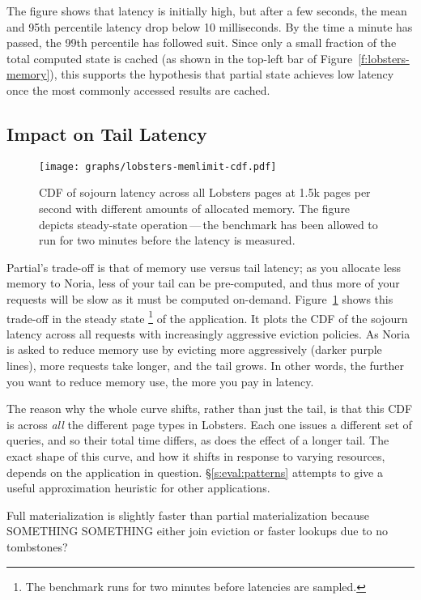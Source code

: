 The figure shows that latency is initially high, but after a few seconds, the
mean and 95th percentile latency drop below 10 milliseconds. By the time a
minute has passed, the 99th percentile has followed suit. Since only a small
fraction of the total computed state is cached (as shown in the top-left bar of
Figure~\ref{f:lobsters-memory}), this supports the hypothesis that partial state 
achieves low latency once the most commonly accessed results are cached.

\subsection{Impact on Tail Latency}

\begin{figure}[h]
  \centering
  \texttt{[image: graphs/lobsters-memlimit-cdf.pdf]}
  \caption{CDF of sojourn latency across all Lobsters pages at 1.5k pages per
  second with different amounts of allocated memory. The figure depicts
  steady-state operation\,---\,the benchmark has been allowed to run for two
  minutes before the latency is measured.}
  \label{f:lobsters-mem-latency}
\end{figure}

Partial's trade-off is that of memory use versus tail latency; as you allocate
less memory to Noria, less of your tail can be pre-computed, and thus more of
your requests will be slow as it must be computed on-demand.
Figure~\ref{f:lobsters-mem-latency} shows this trade-off in the steady state%
\footnote{The benchmark runs for two minutes before latencies are sampled.}
of the application. It plots the CDF of the sojourn latency across all requests
with increasingly aggressive eviction policies. As Noria is asked to
reduce memory use by evicting more aggressively (darker purple lines), more
requests take longer, and the tail grows. In other words, the further you want
to reduce memory use, the more you pay in latency.

The reason why the whole curve shifts, rather than just the tail, is that this
CDF is across \emph{all} the different page types in Lobsters. Each one issues a
different set of queries, and so their total time differs, as does the effect of
a longer tail. The exact shape of this curve, and how it shifts in response to
varying resources, depends on the application in question.
\S\ref{s:eval:patterns} attempts to give a useful approximation heuristic for
other applications.

\begin{inprogress}
Full materialization is slightly faster than partial materialization because
SOMETHING SOMETHING either join eviction or faster lookups due to no tombstones?
\end{inprogress}

